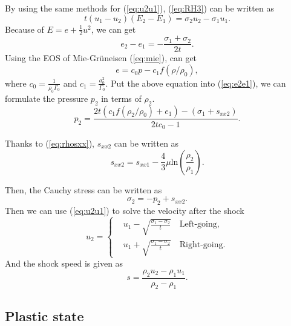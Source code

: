 \documentclass{article}
\numberwithin{equation}{section}
\numberwithin{table}{section}
\begin{document}
By using the same methods for (\ref{eq:u2u1}), (\ref{eq:RH3}) can be written as
\begin{equation}
  t(u_1-u_2)(E_2-E_1) =\sigma_2 u_2-\sigma_1u_1.
\end{equation}
Because of $E= e+\frac{1}{2}u^2$, we can get
\begin{equation}\label{eq:e2e1}
  e_2 - e_1 = - \frac{\sigma_1 +\sigma_2}{2t}.
\end{equation}
Using the EOS of Mie-Gr\"uneisen (\ref{eq:mie}), can get
\begin{equation}
  e = c_0p -c_1f(\rho/\rho_0),
\end{equation}
where $c_0 = \frac{1}{\rho_0\Gamma_0}$ and $c_1 = \frac{a_0^2}{\Gamma_0}$.
Put the above equation into (\ref{eq:e2e1}), we can formulate the pressure $p_2$ in terms of $\rho_2$.
\begin{equation}\label{eq:shocke}
  p_2= \frac{2t(c_1f(\rho_2/\rho_0)+e_1)-(\sigma_1+s_{xx2})}{2tc_0-1}.
\end{equation}

Thanks to (\ref{eq:rhosxx}), $s_{xx2}$ can be written as
\begin{equation}
 s_{xx2} = s_{xx1}-\frac{4}{3}\mu\text{ln}(\frac{\rho_{2}}{\rho_{1}}).
\end{equation}

Then, the Cauchy stress can be written as
\begin{equation}
  \sigma_2 = -p_2 +s_{xx2}.
\end{equation}
Then we can use (\ref{eq:u2u1}) to solve the velocity after the shock
\begin{equation}\label{eq:shocku}
  u_2 = \left\{ \begin{aligned}
	 & u_1 - \sqrt{\frac{\sigma_1- \sigma_2}{t}} \quad \text{Left-going}, \\
	 & u_1 + \sqrt{\frac{\sigma_1- \sigma_2}{t}} \quad \text{Right-going}.
	\end{aligned}
	\right.
  \end{equation}
And the shock speed is given as
\begin{equation}
  s = \frac{\rho_2u_2-\rho_1u_1}{\rho_2-\rho_1}.
\end{equation}


\subsection{Plastic state}
\end{document}
